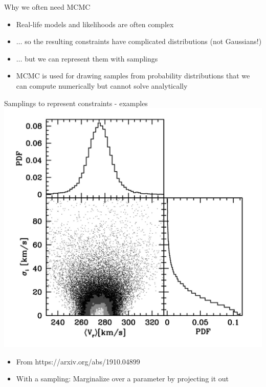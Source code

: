 \documentclass{beamer}
\begin{document}
\begin{frame}{Why we often need MCMC}
  \begin{itemize}
  \item Real-life models and likelihoods are often complex
  \item $\ldots$ so the resulting \alert{constraints} have complicated distributions (not Gaussians!)
  \item $\ldots$ but we can represent them with \alert{samplings}
  \item MCMC is used for drawing samples from probability distributions
        that we can compute numerically but cannot solve analytically
  \end{itemize}
\end{frame}

\begin{frame}{Samplings to represent constraints - examples}
  \includegraphics[height=0.5\textwidth]{corner}
  \begin{itemize}
  \item From https://arxiv.org/abs/1910.04899
  \item With a sampling: \alert{Marginalize} over a parameter by projecting it out
  \end{itemize}
\end{frame}
\end{document}
